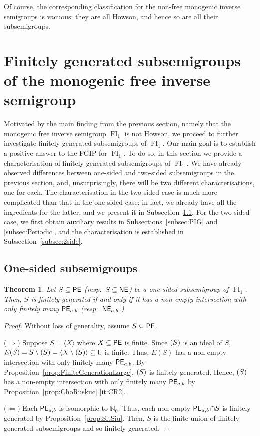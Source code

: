 \documentclass[reqno]{amsart}
\theoremstyle{plain}
\newtheorem{thm}[lem]{Theorem}
\theoremstyle{definition}
\DeclareMathOperator{\FI}{FI}
\let\P\relax
\DeclareMathOperator{\P}{\textup{\textsf{P}}}
\DeclareMathOperator{\E}{\textup{\textsf{E}}}
\DeclareMathOperator{\PE}{\textup{\textsf{PE}}}
\DeclareMathOperator{\NE}{\textup{\textsf{NE}}}
\numberwithin{equation}{section}
\begin{document}
Of course, the corresponding classification for the non-free monogenic inverse semigroups is vacuous: they are all Howson, and hence so are all their subsemigroups.





\section{Finitely generated subsemigroups of the monogenic free inverse semigroup}
\label{sec:Character}

Motivated by the main 
finding from the previous section, 
namely that the monogenic free inverse semigroup $\FI_1$ is not Howson,
we proceed to further investigate  finitely generated subsemigroups of  $\FI_1$.
Our main goal is to establish a positive answer to the FGIP for $\FI_1$. 
To do so, in this section we provide a characterisation of finitely generated subsemigroups of $\FI_1$. We have already observed differences between one-sided and two-sided subsemigroups in the previous section, and, unsurprisingly, there will be two different characterisations, one for each. The characterisation in the two-sided case is much more complicated than that in the one-sided case; in fact, we already have all the ingredients for the 
latter, and we present it in Subsection~\ref{subsec:1side}. For the two-sided case, we first obtain auxiliary results in Subsections~\ref{subsec:PIG} and \ref{subsec:Periodic}, and the characterisation is established in Subsection~\ref{subsec:2side}.


\subsection{One-sided subsemigroups}
\label{subsec:1side}

\begin{thm}
\label{thm:1side}
Let $S\subseteq \PE$ (resp.\ $S\subseteq \NE$) be a one-sided subsemigroup of $\FI_1$. Then, $S$ is finitely generated if and only if it has a non-empty intersection with only finitely many $\PE_{a,b}$ (resp.\ $\NE_{a,b}$.)
\end{thm}

\begin{proof}
Without loss of generality, assume $S\subseteq \PE$.

\noindent ($\Rightarrow$) Suppose $S = \langle X\rangle$ where $X\subseteq \PE$ is finite. Since $\P(S)$ is an ideal of $S$, $E(S) = S\setminus\P(S) = \langle X\setminus\P(S)\rangle \subseteq \E$ is finite. Thus, $E(S)$ has a non-empty intersection with only finitely many $\PE_{a,b}$. By Proposition~\ref{prop:FiniteGenerationLarge}, $\P(S)$ is finitely generated. Hence, $\P(S)$ has a non-empty intersection with only finitely many $\PE_{a,b}$ by Proposition~\ref{prop:ChoRuskuc} \ref{it:CR2}. 


\noindent ($\Leftarrow$) Each $\PE_{a,b}$ is isomorphic to $\mathbb{N}_0$. Thus, each non-empty $\PE_{a,b}\cap S$ is finitely generated by Proposition~\ref{prop:SitSiu}. Then, $S$ is the finite union of finitely generated subsemigroups and so finitely generated.
\end{proof}
\end{document}
